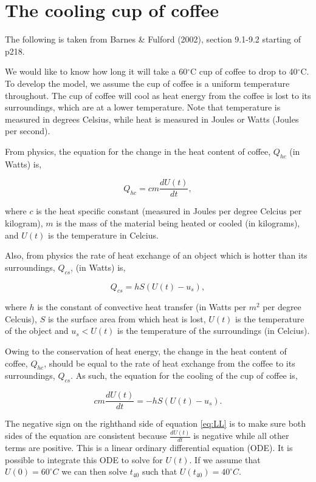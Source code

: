 \documentclass[]{book}
\begin{document}
\section{The cooling cup of coffee}\label{the-cooling-cup-of-coffee}

The following is taken from Barnes \& Fulford (2002), section 9.1-9.2
starting of p218.

We would like to know how long it will take a 60\(^\circ\)C cup of
coffee to drop to 40\(^\circ\)C. To develop the model, we assume the cup
of coffee is a uniform temperature throughout. The cup of coffee will
cool as heat energy from the coffee is lost to its surroundings, which
are at a lower temperature. Note that temperature is measured in degrees
Celsius, while heat is measured in Joules or Watts (Joules per second).

From physics, the equation for the change in the heat content of coffee,
\(Q_{hc}\) (in Watts) is,

\begin{equation}
Q_{hc} = cm \frac{dU(t)}{dt},
\end{equation}

where \(c\) is the heat specific constant (measured in Joules per degree
Celcius per kilogram), \(m\) is the mass of the material being heated or
cooled (in kilograms), and \(U(t)\) is the temperature in Celcius.

Also, from physics the rate of heat exchange of an object which is
hotter than its surroundings, \(Q_{cs}\), (in Watts) is,

\begin{equation}
Q_{cs} = hS(U(t)-u_s),
\end{equation}

where \(h\) is the constant of convective heat transfer (in Watts per
\(m^2\) per degree Celcuis), \(S\) is the surface area from which heat
is lost, \(U(t)\) is the temperature of the object and \(u_s<U(t)\) is
the temperature of the surroundings (in Celcius).

Owing to the conservation of heat energy, the change in the heat content
of coffee, \(Q_{hc}\), should be equal to the rate of heat exchange from
the coffee to its surroundings, \(Q_{cs}\). As such, the equation for
the cooling of the cup of coffee is,

\begin{equation}
cm \frac{dU(t)}{dt}=-hS(U(t)-u_s).
\label{eq:LL}
\end{equation}

The negative sign on the righthand side of equation \eqref{eq:LL} is to
make sure both sides of the equation are consistent because
\(\frac{dU(t)}{dt}\) is negative while all other terms are positive.
This is a linear ordinary differential equation (ODE). It is possible to
integrate this ODE to solve for \(U(t)\). If we assume that
\(U(0) = 60^\circ C\) we can then solve \(t_{40}\) such that
\(U(t_{40}) = 40^\circ C\).
\end{document}

